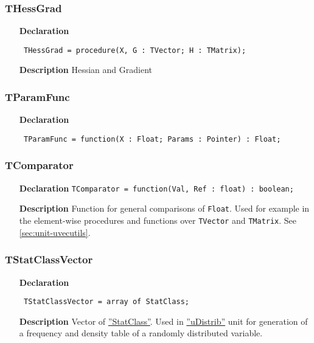\documentclass[12pt,a4paper,oneside]{report}
\newcommand{\lmath}[1]{   %
	\marginpar{\vspace{#1} 
		\begin{flushright}
			LMath
	\end{flushright} }
}
\newcommand{\lmatha}[1]{   %
	\marginpar{\vspace{#1} 
		\begin{flushright}
			LMath 0.5
	\end{flushright} }
}
\newcommand{\declarationitem}[1]{\textbf{#1}}
\newcommand{\descriptiontitle}[1]{\textbf{#1}}
\newcommand{\code}[1]{\texttt{#1}}
\begin{document}
\subsubsection{THessGrad}
\label{utypes-THessGrad}
\begin{itemize}\item[\declarationitem{Declaration}\hfill]
	\begin{flushleft}
		\code{
			THessGrad = procedure(X, G : TVector; H : TMatrix);}
		
	\end{flushleft}
	
	\par
	\item[\descriptiontitle{Description}]
	Hessian and Gradient
	
\end{itemize}
\subsubsection{TParamFunc}
\lmath{-24pt}
\label{utypes-TParamFunc}
\begin{itemize}\item[\declarationitem{Declaration}\hfill]
	\begin{flushleft}
		\code{
			TParamFunc = function(X : Float; Params : Pointer) : Float;}
	\end{flushleft}
\end{itemize}
\subsubsection{TComparator}
\label{utypes-TComparator}
\lmatha{-24pt}
\begin{itemize}
	\item[\declarationitem{Declaration}\hfill]
	\code{TComparator = function(Val, Ref : float) : boolean;}
	\item[\descriptiontitle{Description}]Function for general comparisons of \code{Float}. Used for example in the element-wise procedures and functions over \code{TVector} and \code{TMatrix}. See \ref{sec:unit-uvecutils}.
\end{itemize}
\subsubsection{TStatClassVector}
\label{utypes-TStatClassVector}
\begin{itemize}
	\item[\declarationitem{Declaration}\hfill]
	\begin{flushleft}
		\code{
			TStatClassVector = array of StatClass;}
	\end{flushleft}
	\item[\descriptiontitle{Description}]
Vector of \hyperref[sec:statclass]{''StatClass''}. Used in \hyperref[udistrib]{''uDistrib''} unit for generation of a frequency and density table of a randomly distributed variable.
\end{itemize}
\end{document}
